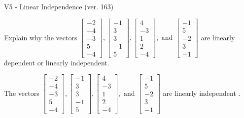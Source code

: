 \begin{exercise}
  \begin{exerciseTitle}V5 - Linear Independence (ver. 163)\end{exerciseTitle}
  \begin{exerciseStatement}
    Explain why the vectors \(\left[\begin{array}{r}
-2 \\
-4 \\
-3 \\
5 \\
-4
\end{array}\right] , \left[\begin{array}{r}
-1 \\
3 \\
3 \\
-1 \\
5
\end{array}\right] , \left[\begin{array}{r}
4 \\
-3 \\
1 \\
2 \\
-4
\end{array}\right] , \text{ and } \left[\begin{array}{r}
-1 \\
5 \\
-2 \\
3 \\
-1
\end{array}\right]\) are linearly dependent or linearly independent.	


  \end{exerciseStatement}
  \begin{exerciseAnswer}
   The vectors \(\left[\begin{array}{r}
-2 \\
-4 \\
-3 \\
5 \\
-4
\end{array}\right] , \left[\begin{array}{r}
-1 \\
3 \\
3 \\
-1 \\
5
\end{array}\right] , \left[\begin{array}{r}
4 \\
-3 \\
1 \\
2 \\
-4
\end{array}\right] , \text{ and } \left[\begin{array}{r}
-1 \\
5 \\
-2 \\
3 \\
-1
\end{array}\right]\) are 
  	 linearly independent  .
  


  \end{exerciseAnswer}
\end{exercise}